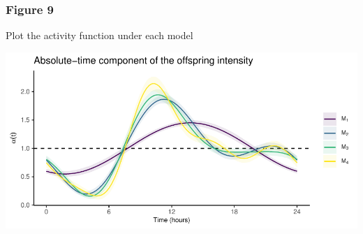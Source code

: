 \documentclass[
]{article}
\begin{document}
\hypertarget{figure-9}{%
\subsubsection{Figure 9}\label{figure-9}}

Plot the activity function under each model

\includegraphics{figures_and_tables_files/figure-latex/freq_activity_functions-1.pdf}
\end{document}
